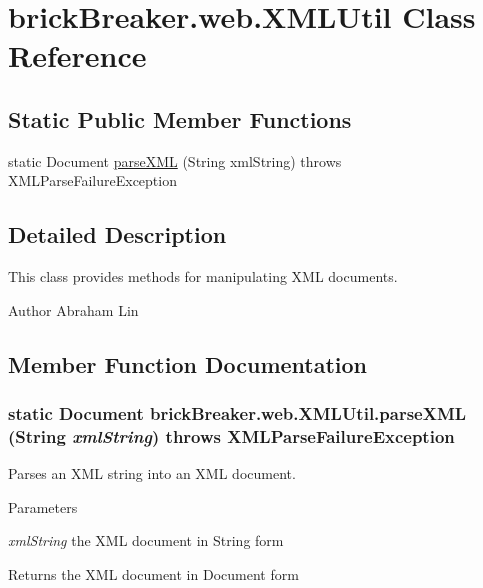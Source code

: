 \hypertarget{classbrick_breaker_1_1web_1_1_x_m_l_util}{
\section{brickBreaker.web.XMLUtil Class Reference}
\label{classbrick_breaker_1_1web_1_1_x_m_l_util}
}
\subsection*{Static Public Member Functions}
\begin{DoxyCompactItemize}
\item 
static Document \hyperlink{classbrick_breaker_1_1web_1_1_x_m_l_util_a0a68ec3df3895e11d5c847f68af7953f}{parseXML} (String xmlString)  throws XMLParseFailureException 
\end{DoxyCompactItemize}


\subsection{Detailed Description}
This class provides methods for manipulating XML documents.

\begin{DoxyAuthor}{Author}
Abraham Lin 
\end{DoxyAuthor}


\subsection{Member Function Documentation}
\hypertarget{classbrick_breaker_1_1web_1_1_x_m_l_util_a0a68ec3df3895e11d5c847f68af7953f}{
\subsubsection[{parseXML}]{\setlength{\rightskip}{0pt plus 5cm}static Document brickBreaker.web.XMLUtil.parseXML (String {\em xmlString})  throws {\bf XMLParseFailureException} }}
\label{classbrick_breaker_1_1web_1_1_x_m_l_util_a0a68ec3df3895e11d5c847f68af7953f}
Parses an XML string into an XML document.


\begin{DoxyParams}{Parameters}
\item[{\em xmlString}]the XML document in {\ttfamily String} form \end{DoxyParams}
\begin{DoxyReturn}{Returns}
the XML document in {\ttfamily Document} form
\end{DoxyReturn}

